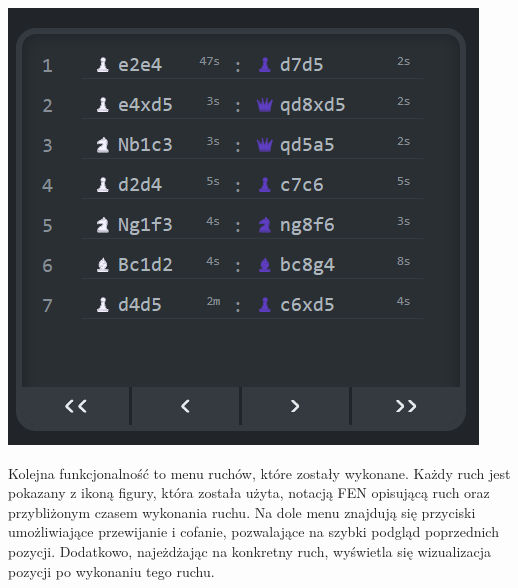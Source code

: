 \documentclass[twoside]{projektInzynierskiMS1}
\begin{document}
\noindent
\begin{minipage}[t]{0.45\textwidth} 
    \vspace{0pt} 
    \centering 
    \includegraphics[width=\linewidth]{images/ins_min_moves.png} 
\end{minipage} 
\hfill 
\begin{minipage}[t]{0.45\textwidth} 
    \vspace{0pt} 
    \justifying 
    \noindent 
    Kolejna funkcjonalność to menu ruchów, które zostały wykonane. Każdy ruch jest pokazany z ikoną figury, która została użyta, notacją FEN opisującą ruch oraz przybliżonym czasem wykonania ruchu. Na dole menu znajdują się przyciski umożliwiające przewijanie i cofanie, pozwalające na szybki podgląd poprzednich pozycji. Dodatkowo, najeżdżając na konkretny ruch, wyświetla się wizualizacja pozycji po wykonaniu tego ruchu.
\end{minipage}

\vspace{1cm}
\end{document}
